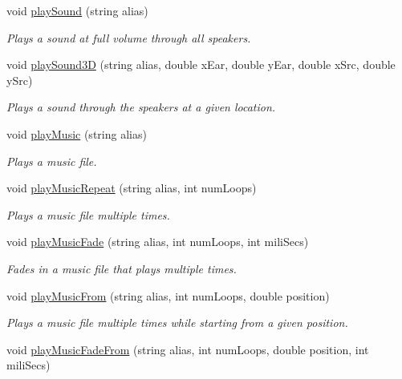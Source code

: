 \begin{CompactItemize}
void \hyperlink{class_resource_mgr_1122bf9ce3cbcebc6978efa63904dcac}{playSound} (string alias)
\begin{CompactList}\small\item\em Plays a sound at full volume through all speakers. \item\end{CompactList}\item 
void \hyperlink{class_resource_mgr_9b916235594f034f55da0570182ca429}{playSound3D} (string alias, double xEar, double yEar, double xSrc, double ySrc)
\begin{CompactList}\small\item\em Plays a sound through the speakers at a given location. \item\end{CompactList}\item 
void \hyperlink{class_resource_mgr_27e40623d8659a8ee488550a4f79913e}{playMusic} (string alias)
\begin{CompactList}\small\item\em Plays a music file. \item\end{CompactList}\item 
void \hyperlink{class_resource_mgr_c07602fe156a2903fa6bbcb679ef74ea}{playMusicRepeat} (string alias, int numLoops)
\begin{CompactList}\small\item\em Plays a music file multiple times. \item\end{CompactList}\item 
void \hyperlink{class_resource_mgr_3202543d74c502aeb3bd1990f1137236}{playMusicFade} (string alias, int numLoops, int miliSecs)
\begin{CompactList}\small\item\em Fades in a music file that plays multiple times. \item\end{CompactList}\item 
void \hyperlink{class_resource_mgr_828047831e8668f7189770e45afa50c3}{playMusicFrom} (string alias, int numLoops, double position)
\begin{CompactList}\small\item\em Plays a music file multiple times while starting from a given position. \item\end{CompactList}\item 
void \hyperlink{class_resource_mgr_ccdc08e8b11c17fb10ed93b7d51e45b0}{playMusicFadeFrom} (string alias, int numLoops, double position, int miliSecs)

\end{CompactItemize}
